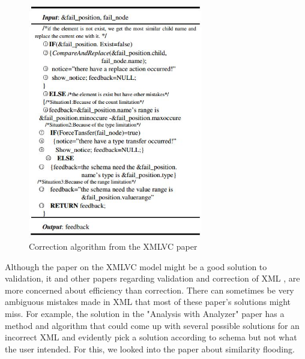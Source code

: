 \documentclass{report}
\begin{document}
\begin{figure}[H]
\centering
\includegraphics[width=3in]{XMLVC-correction-algorithm}%
\caption{Correction algorithm from the XMLVC paper \cite{ying2012xmlvc}}%
\label{fig:xmlvccorrectionalgo}%
\end{figure}


Although the paper on the XMLVC model might be a good solution to validation, it and other papers regarding validation and correction of XML \cite{barnard1995tree} \cite{starka2011xml}, are more concerned about efficiency than correction. There can sometimes be very ambiguous mistakes made in XML that most of these paper's solutions might miss. For example, the solution in the "Analysis with Analyzer" paper has a method and algorithm that could come up with several possible solutions for an incorrect XML and evidently pick a solution according to schema but not what the user intended. For this, we looked into the paper about similarity flooding. 
\end{document}
